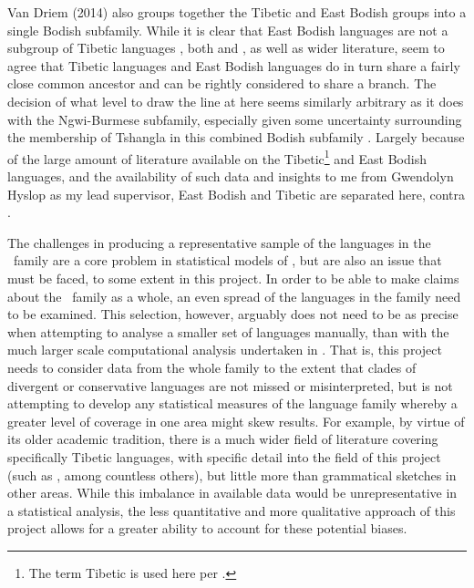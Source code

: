 Van Driem (2014) also groups together the Tibetic and East Bodish groups into a single Bodish subfamily. While it is clear that East Bodish languages are not a subgroup of Tibetic languages \cite{Hyslop2017}, both  and , as well as wider literature, seem to agree that Tibetic languages and East Bodish languages do in turn share a fairly close common ancestor and can be rightly considered to share a branch. The decision of what level to draw the line at here seems similarly arbitrary as it does with the Ngwi-Burmese subfamily, especially given some uncertainty surrounding the membership of Tshangla in this combined Bodish subfamily \cite{Thurgood2017STIntro}. Largely because of the large amount of literature available on the Tibetic\footnote{The term Tibetic is used here per .} and East Bodish languages, and the availability of such data and insights to me from Gwendolyn Hyslop as my lead supervisor, East Bodish and Tibetic are separated here, contra . 

The challenges in producing a representative sample of the languages in the \lfam\ family are a core problem in statistical models of , but are also an issue that must be faced, to some extent in this project. In order to be able to make claims about the \lfam\ family as a whole, an even spread of the languages in the family need to be examined. This selection, however, arguably does not need to be as precise when attempting to analyse a smaller set of languages manually, than with the much larger scale computational analysis undertaken in . That is, this project needs to consider data from the whole family to the extent that clades of divergent or conservative languages are not missed or misinterpreted, but is not attempting to develop any statistical measures of the language family whereby a greater level of coverage in one area might skew results. For example, by virtue of its older academic tradition, there is a much wider field of literature covering specifically Tibetic languages, with specific detail into the field of this project (such as , among countless others), but little more than grammatical sketches in other areas. While this imbalance in available data would be unrepresentative in a statistical analysis, the less quantitative and more qualitative approach of this project allows for a greater ability to account for these potential biases.

